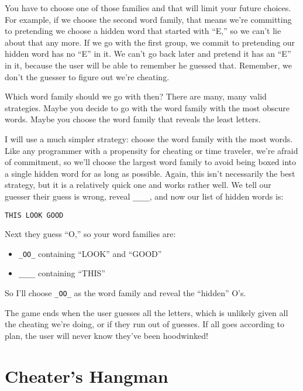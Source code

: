 \documentclass[10pt,letterpaper]{article}
\begin{document}
You have to choose one of those families and that will limit your future choices.
For example, if we choose the second word family, that means we're committing to pretending we choose a hidden word that started with ``E,'' so we can't lie about that any more.
If we go with the first group, we commit to pretending our hidden word has no ``E'' in it.
We can't go back later and pretend it has an ``E'' in it, because the user will be able to remember he guessed that.
Remember, we don't the guesser to figure out we're cheating.


Which word family should we go with then? 
There are many, many valid strategies. 
Maybe you decide to go with the word family with the most obscure words.
Maybe you choose the word family that reveals the least letters.

I will use a much simpler strategy: choose the word family with the most words.
Like any programmer with a propensity for cheating or time traveler, we're afraid of commitment, so we'll choose the largest word family to avoid being boxed into a single hidden word for as long as possible.
Again, this isn't necessarily the best strategy, but it is a relatively quick one and works rather well.
We tell our guesser their guess is wrong, reveal \texttt{\_\_\_\_},  and now our list of hidden words is:



\begin{center}
	\texttt{THIS LOOK GOOD}
\end{center}

Next they guess ``O,'' so your word families are:

\begin{itemize}
	\item \texttt{\_OO\_} containing ``LOOK'' and ``GOOD''
	\item \texttt{\_\_\_\_} containing ``THIS''
\end{itemize}

So I'll choose \texttt{\_OO\_}  as the word family and reveal the ``hidden'' O's.

The game ends when the user guesses all the letters, which is unlikely given all the cheating we're doing, or if they run out of guesses.
If all goes according to plan, the user will never know they've been hoodwinked!

\section{Cheater's Hangman}
\end{document}
